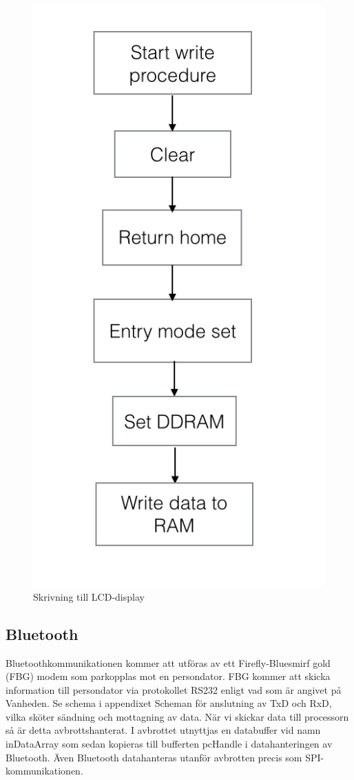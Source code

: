\documentclass[a4paper,12pt,fleqn]{article}
\begin{document}
\begin{figure}[htp] %
  \begin{center}
  \includegraphics[keepaspectratio=true,scale=0.4]{bilder/write}  %
  \end{center}
  \caption{Skrivning till LCD-display} %
  \label{fig:flowlcdwrite}
\end{figure}

\subsection{Bluetooth}
Bluetoothkommunikationen kommer att utföras av ett Firefly-Bluesmirf gold (FBG) modem som parkopplas mot en persondator.
FBG kommer att skicka information till persondator via protokollet RS232 enligt vad som är angivet på Vanheden. 
Se schema i appendixet Scheman för anslutning av TxD och RxD, vilka sköter sändning och mottagning av data.
När vi skickar data till processorn så är detta avbrottshanterat. I avbrottet utnyttjas en databuffer vid namn inDataArray som sedan kopieras till bufferten pcHandle i datahanteringen av Bluetooth. Även Bluetooth datahanteras utanför avbrotten precis som SPI-kommunikationen.
\end{document}
